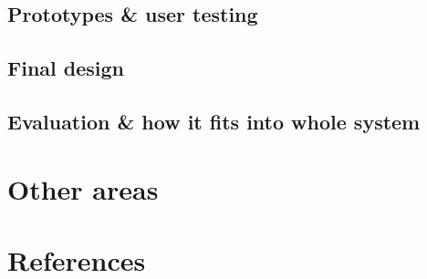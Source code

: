 \documentclass{article}
\begin{document}
\subsection{Prototypes \& user testing}
\subsection{Final design}
\subsection{Evaluation \& how it fits into whole system}
\section{Other areas}

\section{References}
\end{document}
